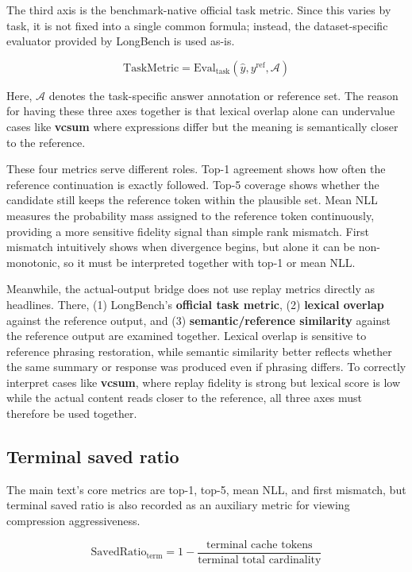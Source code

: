 The third axis is the benchmark-native official task metric. Since this varies by task, it is not fixed into a single common formula; instead, the dataset-specific evaluator provided by LongBench is used as-is.


$$
\mathrm{TaskMetric}
=
\mathrm{Eval}_{\mathrm{task}}(\hat{y}, y^{\mathrm{ref}}, \mathcal{A})
$$


Here, $\mathcal{A}$ denotes the task-specific answer annotation or reference set. The reason for having these three axes together is that lexical overlap alone can undervalue cases like \textbf{vcsum} where expressions differ but the meaning is semantically closer to the reference.


These four metrics serve different roles. Top-1 agreement shows how often the reference continuation is exactly followed. Top-5 coverage shows whether the candidate still keeps the reference token within the plausible set. Mean NLL measures the probability mass assigned to the reference token continuously, providing a more sensitive fidelity signal than simple rank mismatch. First mismatch intuitively shows when divergence begins, but alone it can be non-monotonic, so it must be interpreted together with top-1 or mean NLL.


Meanwhile, the actual-output bridge does not use replay metrics directly as headlines. There, (1) LongBench's \textbf{official task metric}, (2) \textbf{lexical overlap} against the reference output, and (3) \textbf{semantic/reference similarity} against the reference output are examined together. Lexical overlap is sensitive to reference phrasing restoration, while semantic similarity better reflects whether the same summary or response was produced even if phrasing differs. To correctly interpret cases like \textbf{vcsum}, where replay fidelity is strong but lexical score is low while the actual content reads closer to the reference, all three axes must therefore be used together.


\subsection{Terminal saved ratio}


The main text's core metrics are top-1, top-5, mean NLL, and first mismatch, but terminal saved ratio is also recorded as an auxiliary metric for viewing compression aggressiveness.


$$
\mathrm{SavedRatio}_{\mathrm{term}}
=
1 - \frac{\text{terminal cache tokens}}{\text{terminal total cardinality}}
$$


